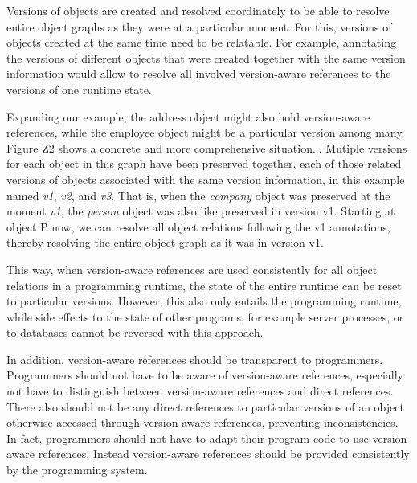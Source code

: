 


Versions of objects are created and resolved coordinately to be able to resolve entire object graphs as they were at a particular moment.
For this, versions of objects created at the same time need to be relatable.
For example, annotating the versions of different objects that were created together with the same version information would allow to resolve all involved version-aware references to the versions of one runtime state.

Expanding our example, the address object might also hold version-aware references, while the employee object might be a particular version among many.
Figure Z2 shows a concrete and more comprehensive situation...
Mutiple versions for each object in this graph have been preserved together, each of those related versions of objects associated with the same version information, in this example named \emph{v1}, \emph{v2}, and \emph{v3}.
That is, when the \emph{company} object was preserved at the moment \emph{v1}, the \emph{person} object  was also like preserved in version v1.
Starting at object P now, we can resolve all object relations following the v1 annotations, thereby resolving the entire object graph as it was in version v1.


This way, when version-aware references are used consistently for all object relations in a programming runtime, the state of the entire runtime can be reset to particular versions.
However, this also only entails the programming runtime, while side effects to the state of other programs, for example server processes, or to databases cannot be reversed with this approach.

In addition, version-aware references should be transparent to programmers.
Programmers should not have to be aware of version-aware references, especially not have to distinguish between version-aware references and direct references.
There also should not be any direct references to particular versions of an object otherwise accessed through version-aware references, preventing inconsistencies.
In fact, programmers should not have to adapt their program code to use version-aware references.
Instead version-aware references should be provided consistently by the programming system.


